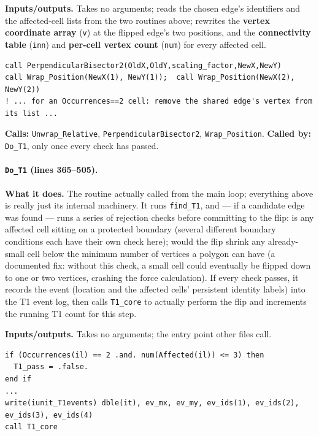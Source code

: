 \documentclass[11pt]{article}
\begin{document}
\textbf{Inputs/outputs.} Takes no arguments; reads the chosen edge's identifiers and
the affected-cell lists from the two routines above; rewrites the \textbf{vertex
coordinate array} (\texttt{v}) at the flipped edge's two positions, and the
\textbf{connectivity table} (\texttt{inn}) and \textbf{per-cell vertex count}
(\texttt{num}) for every affected cell.

\begin{lstlisting}[caption={The new, perpendicular edge position, and one ``losing'' cell's vertex-splice, in \texttt{T1\_core}.}]
call PerpendicularBisector2(OldX,OldY,scaling_factor,NewX,NewY)
call Wrap_Position(NewX(1), NewY(1));  call Wrap_Position(NewX(2), NewY(2))
! ... for an Occurrences==2 cell: remove the shared edge's vertex from its list ...
\end{lstlisting}

\textbf{Calls:} \texttt{Unwrap\_Relative}, \texttt{PerpendicularBisector2},
\texttt{Wrap\_Position}. \textbf{Called by:} \texttt{Do\_T1}, only once every check has
passed.

\paragraph{\texttt{Do\_T1} (lines 365--505).}
\textbf{What it does.} The routine actually called from the main loop; everything
above is really just its internal machinery. It runs \texttt{find\_T1}, and --- if a
candidate edge was found --- runs a series of rejection checks before committing to the
flip: is any affected cell sitting on a protected boundary (several different boundary
conditions each have their own check here); would the flip shrink any already-small
cell below the minimum number of vertices a polygon can have (a documented fix: without
this check, a small cell could eventually be flipped down to one or two vertices,
crashing the force calculation). If every check passes, it records the event (location
and the affected cells' persistent identity labels) into the T1 event log, then calls
\texttt{T1\_core} to actually perform the flip and increments the running T1 count for
this step.

\textbf{Inputs/outputs.} Takes no arguments; the entry point other files call.

\begin{lstlisting}[caption={The degenerate-cell rejection check and the event-log write, in \texttt{Do\_T1}.}]
if (Occurrences(il) == 2 .and. num(Affected(il)) <= 3) then
  T1_pass = .false.
end if
...
write(iunit_T1events) dble(it), ev_mx, ev_my, ev_ids(1), ev_ids(2), ev_ids(3), ev_ids(4)
call T1_core
\end{lstlisting}
\end{document}
